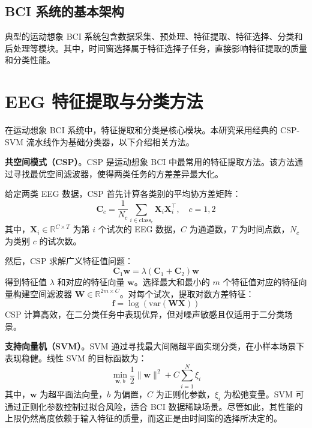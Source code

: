 \subsection{BCI 系统的基本架构}
\label{subsec:bci_architecture}

典型的运动想象 BCI 系统包含数据采集、预处理、特征提取、特征选择、分类和后处理等模块\cite{tangermann2012review}。其中，时间窗选择属于特征选择子任务，直接影响特征提取的质量和分类性能。

\section{EEG 特征提取与分类方法}
\label{sec:feature_classification}

在运动想象 BCI 系统中，特征提取和分类是核心模块\cite{lotte2007review}。本研究采用经典的 CSP-SVM 流水线作为基础分类器，以下介绍相关方法。

\textbf{共空间模式（CSP）}。CSP 是运动想象 BCI 中最常用的特征提取方法\cite{blankertz2008optimizing}。该方法通过寻找最优空间滤波器，使得两类任务的方差差异最大化。

给定两类 EEG 数据，CSP 首先计算各类别的平均协方差矩阵：
\begin{equation}
\mathbf{C}_c = \frac{1}{N_c} \sum_{i \in \text{class}_c} \mathbf{X}_i \mathbf{X}_i^\top, \quad c = 1, 2
\end{equation}
其中，$\mathbf{X}_i \in \mathbb{R}^{C \times T}$ 为第 $i$ 个试次的 EEG 数据，$C$ 为通道数，$T$ 为时间点数，$N_c$ 为类别 $c$ 的试次数\cite{blankertz2008optimizing}。

然后，CSP 求解广义特征值问题：
\begin{equation}
\mathbf{C}_1 \mathbf{w} = \lambda (\mathbf{C}_1 + \mathbf{C}_2) \mathbf{w}
\end{equation}
得到特征值 $\lambda$ 和对应的特征向量 $\mathbf{w}$\cite{blankertz2008optimizing}。选择最大和最小的 $m$ 个特征值对应的特征向量构建空间滤波器 $\mathbf{W} \in \mathbb{R}^{2m \times C}$。对每个试次，提取对数方差特征：
\begin{equation}
\mathbf{f} = \log \left( \text{var}(\mathbf{W} \mathbf{X}) \right)
\end{equation}
CSP 计算高效，在二分类任务中表现优异，但对噪声敏感且仅适用于二分类场景\cite{lotte2011regularizing}。

\textbf{支持向量机（SVM）}。SVM 通过寻找最大间隔超平面实现分类，在小样本场景下表现稳健\cite{lotte2007review}。线性 SVM 的目标函数为：
\begin{equation}
\min_{\mathbf{w}, b} \frac{1}{2} \|\mathbf{w}\|^2 + C \sum_{i=1}^N \xi_i
\end{equation}
其中，$\mathbf{w}$ 为超平面法向量，$b$ 为偏置，$C$ 为正则化参数，$\xi_i$ 为松弛变量。SVM 可通过正则化参数控制过拟合风险，适合 BCI 数据稀缺场景。尽管如此，其性能的上限仍然高度依赖于输入特征的质量，而这正是由时间窗的选择所决定的。

